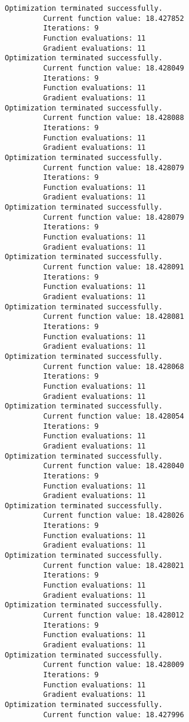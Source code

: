 \documentclass[11pt]{article}
\begin{document}
    \begin{Verbatim}[commandchars=\\\{\}]
Optimization terminated successfully.
         Current function value: 18.427852
         Iterations: 9
         Function evaluations: 11
         Gradient evaluations: 11
Optimization terminated successfully.
         Current function value: 18.428049
         Iterations: 9
         Function evaluations: 11
         Gradient evaluations: 11
Optimization terminated successfully.
         Current function value: 18.428088
         Iterations: 9
         Function evaluations: 11
         Gradient evaluations: 11
Optimization terminated successfully.
         Current function value: 18.428079
         Iterations: 9
         Function evaluations: 11
         Gradient evaluations: 11
Optimization terminated successfully.
         Current function value: 18.428079
         Iterations: 9
         Function evaluations: 11
         Gradient evaluations: 11
Optimization terminated successfully.
         Current function value: 18.428091
         Iterations: 9
         Function evaluations: 11
         Gradient evaluations: 11
Optimization terminated successfully.
         Current function value: 18.428081
         Iterations: 9
         Function evaluations: 11
         Gradient evaluations: 11
Optimization terminated successfully.
         Current function value: 18.428068
         Iterations: 9
         Function evaluations: 11
         Gradient evaluations: 11
Optimization terminated successfully.
         Current function value: 18.428054
         Iterations: 9
         Function evaluations: 11
         Gradient evaluations: 11
Optimization terminated successfully.
         Current function value: 18.428040
         Iterations: 9
         Function evaluations: 11
         Gradient evaluations: 11
Optimization terminated successfully.
         Current function value: 18.428026
         Iterations: 9
         Function evaluations: 11
         Gradient evaluations: 11
Optimization terminated successfully.
         Current function value: 18.428021
         Iterations: 9
         Function evaluations: 11
         Gradient evaluations: 11
Optimization terminated successfully.
         Current function value: 18.428012
         Iterations: 9
         Function evaluations: 11
         Gradient evaluations: 11
Optimization terminated successfully.
         Current function value: 18.428009
         Iterations: 9
         Function evaluations: 11
         Gradient evaluations: 11
Optimization terminated successfully.
         Current function value: 18.427996

\end{Verbatim}
\end{document}

